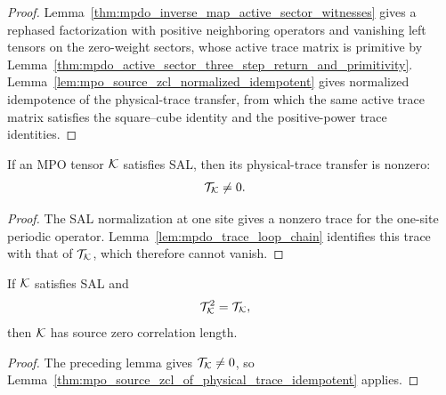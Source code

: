 \begin{proof}
    \leanok
    Lemma~\ref{thm:mpdo_inverse_map_active_sector_witnesses} gives a
    rephased factorization with positive neighboring operators and vanishing
    left tensors on the zero-weight sectors, whose active trace matrix is
    primitive by
    Lemma~\ref{thm:mpdo_active_sector_three_step_return_and_primitivity}.
    Lemma~\ref{lem:mpo_source_zcl_normalized_idempotent} gives normalized
    idempotence of the physical-trace transfer, from which the same active trace
    matrix satisfies the square--cube identity and the positive-power trace
    identities.
\end{proof}

\begin{lemma}
    \label{lem:mpdo_sal_phys_trace_transfer_nonzero}
    \leanok
    If an MPO tensor ${\cal K}$ satisfies SAL, then its physical-trace
    transfer is nonzero:
    \begin{align}
        \mathcal T_{\cal K} & \ne0. \notag
    \end{align}
\end{lemma}

\begin{proof}\leanok
    The SAL normalization at one site gives a nonzero trace for the one-site
    periodic operator. Lemma~\ref{lem:mpdo_trace_loop_chain} identifies this
    trace with that of $\mathcal T_{\cal K}$, which therefore cannot vanish.
\end{proof}

\begin{lemma}
    \label{thm:mpdo_sal_literal_idempotence_source_zcl}
    \leanok
    If ${\cal K}$ satisfies SAL and
    \begin{align}
        \mathcal T_{\cal K}^2 & =\mathcal T_{\cal K}, \notag
    \end{align}
    then ${\cal K}$ has source zero correlation length.
\end{lemma}

\begin{proof}\leanok
    The preceding lemma gives $\mathcal T_{\cal K}\ne0$, so
    Lemma~\ref{thm:mpo_source_zcl_of_physical_trace_idempotent} applies.
\end{proof}

